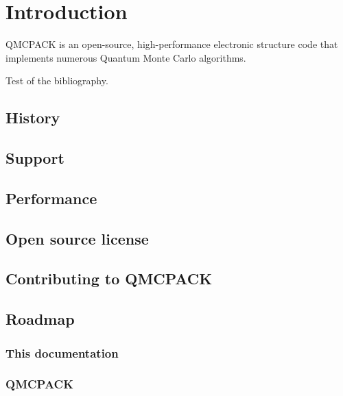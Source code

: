 \chapter{Introduction}

QMCPACK is an open-source, high-performance electronic structure code that implements numerous Quantum Monte Carlo algorithms.

Test of the bibliography\cite{CeperleyAlderPRL1980}.

\section{History}
\section{Support}
\section{Performance}
\section{Open source license}
\section{Contributing to QMCPACK}
\section{Roadmap}
\subsection{This documentation}
\subsection{QMCPACK}
